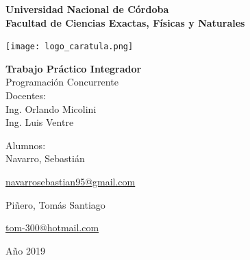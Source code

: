 \documentclass[12pt,a4paper]{article}
\begin{document}
\begin{titlepage}
    \begin{center}
        \vspace*{1cm}
        
        \Large
        \textbf{Universidad Nacional de Córdoba\\
        		Facultad de Ciencias Exactas, Físicas y Naturales}
        
        \vspace{0.5cm}
        \texttt{[image: logo\_caratula.png]}
        
        \vspace{1cm}
        
        \textbf{Trabajo Práctico Integrador}\\
        Programación Concurrente\\
        Docentes: \\
        Ing. Orlando Micolini\\
        Ing. Luis Ventre
        
        \vfill  
        
        \vspace{0.5cm}
        

        Alumnos:\\
        \Large
        Navarro, Sebastián\\
        
        \begin{large}
        \href{mailto:navarrosebastian95@gmail.com}{navarrosebastian95@gmail.com}\\
		\end{large} 
		
        Piñero, Tomás Santiago\\
        
        \begin{large}
        \href{mailto:tom-300@hotmail.com}{tom-300@hotmail.com}\\
		\end{large} 
		
        Año 2019\\
        
        
    \end{center}
\end{titlepage}

\setcounter{secnumdepth}{1}
\setcounter{tocdepth}{5}
\tableofcontents

\end{document}
